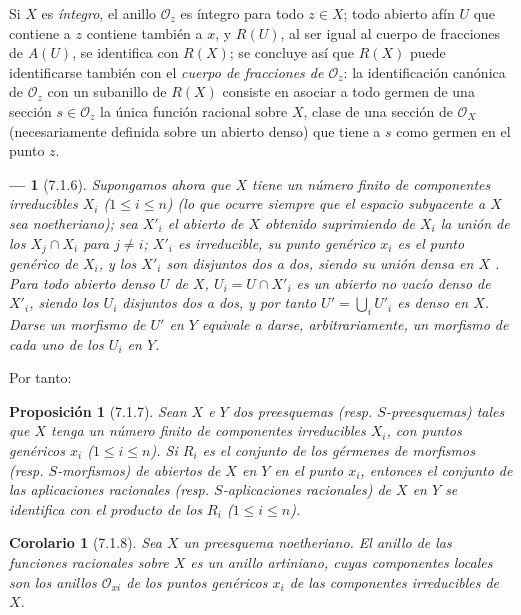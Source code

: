 \documentclass[oneside]{amsart}
\theoremstyle{ega-env-style}
\newtheorem*{env}{---}
\theoremstyle{ega-thm-env-style}
\newtheorem*{proposition}{Proposición}
\newtheorem*{corollary}{Corolario}
\theoremstyle{ega-defn-env-style}
\def\leq{\leqslant}                 %
\newcommand{\oldpage}[2][]{{\marginnote{\normalfont{\textbf{#1}~|~#2}}}\ignorespaces}
\let\EGAOriginalLabel\label
\renewcommand{\label}[1]{\phantomsection\EGAOriginalLabel{#1}}
\begin{document}
Si $X$ es \emph{íntegro}, el anillo $\mathscr{O}_z$ es íntegro para todo $z\in X$; todo abierto afín $U$ que contiene a $z$ contiene también a $x$, y $R(U)$, al ser igual al cuerpo de fracciones de $A(U)$, se identifica con $R(X)$; se concluye así que $R(X)$ puede identificarse también con el \emph{cuerpo de fracciones de $\mathscr{O}_z$}: la identificación canónica de $\mathscr{O}_z$ con un subanillo de $R(X)$ consiste en asociar a todo germen de una sección $s\in\mathscr{O}_z$ la única función racional sobre $X$, clase de una sección de $\mathscr{O}_X$ (necesariamente definida sobre un abierto denso) que tiene a $s$ como germen en el punto $z$.

\begin{env}[7.1.6]
\label{I.7.1.6}
Supongamos ahora que $X$ tiene un número \emph{finito} de componentes irreducibles $X_i$ ($1\leq i\leq n$) (lo que ocurre siempre que el espacio subyacente a $X$ sea \emph{noetheriano}); sea $X'_i$ el abierto de $X$ obtenido suprimiendo de $X_i$ la unión de los $X_j\cap X_i$ para $j\neq i$; $X'_i$ es irreducible, su punto genérico $x_i$ es el punto genérico de $X_i$, y los $X'_i$ son disjuntos dos a dos, siendo su unión densa en $X$ .
Para
\oldpage[I]{157}
todo abierto denso $U$ de $X$, $U_i=U\cap X'_i$ es un abierto no vacío denso de $X'_i$, siendo los $U_i$ disjuntos dos a dos, y por tanto $U'=\bigcup_i U'_i$ es denso en $X$.
Darse un morfismo de $U'$ en $Y$ equivale a darse, arbitrariamente, un morfismo de cada uno de los $U_i$ en $Y$.
\end{env}

Por tanto:
\begin{proposition}[7.1.7]
\label{I.7.1.7}
Sean $X$ e $Y$ dos preesquemas (\textup{resp.} $S$-preesquemas) tales que $X$ tenga un número finito de componentes irreducibles $X_i$, con puntos genéricos $x_i$ ($1\leq i\leq n$).
Si $R_i$ es el conjunto de los gérmenes de morfismos (\textup{resp.} $S$-morfismos) de abiertos de $X$ en $Y$ en el punto $x_i$, entonces el conjunto de las aplicaciones racionales (\textup{resp.} $S$-aplicaciones racionales) de $X$ en $Y$ se identifica con el producto de los $R_i$ ($1\leq i\leq n$).
\end{proposition}

\begin{corollary}[7.1.8]
\label{I.7.1.8}
Sea $X$ un preesquema noetheriano.
El anillo de las funciones racionales sobre $X$ es un anillo artiniano, cuyas componentes locales son los anillos $\mathscr{O}_{xi}$ de los puntos genéricos $x_i$ de las componentes irreducibles de $X$.
\end{corollary}
\end{document}
